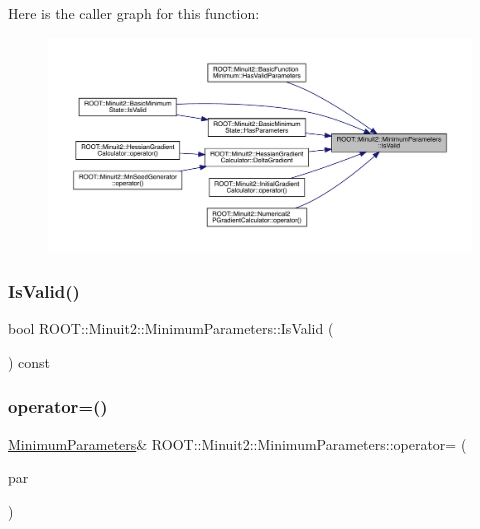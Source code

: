 Here is the caller graph for this function\+:
\nopagebreak
\begin{figure}[H]
\begin{center}
\leavevmode
\includegraphics[width=350pt]{db/db8/classROOT_1_1Minuit2_1_1MinimumParameters_a4b30eb313781bc8e344efa322461952a_icgraph}
\end{center}
\end{figure}
\mbox{\label{classROOT_1_1Minuit2_1_1MinimumParameters_a4b30eb313781bc8e344efa322461952a}} 
\subsubsection{\texorpdfstring{IsValid()}{IsValid()}\hspace{0.1cm}{\footnotesize\ttfamily [3/3]}}
{\footnotesize\ttfamily bool R\+O\+O\+T\+::\+Minuit2\+::\+Minimum\+Parameters\+::\+Is\+Valid (\begin{DoxyParamCaption}{ }\end{DoxyParamCaption}) const\hspace{0.3cm}{\ttfamily [inline]}}

\mbox{\label{classROOT_1_1Minuit2_1_1MinimumParameters_a60b35f7b9d6b7e49d2573581a3a9f081}} 
\subsubsection{\texorpdfstring{operator=()}{operator=()}\hspace{0.1cm}{\footnotesize\ttfamily [1/3]}}
{\footnotesize\ttfamily \mbox{\hyperlink{classROOT_1_1Minuit2_1_1MinimumParameters}{Minimum\+Parameters}}\& R\+O\+O\+T\+::\+Minuit2\+::\+Minimum\+Parameters\+::operator= (\begin{DoxyParamCaption}\item[{const \mbox{\hyperlink{classROOT_1_1Minuit2_1_1MinimumParameters}{Minimum\+Parameters}} \&}]{par }\end{DoxyParamCaption})\hspace{0.3cm}{\ttfamily [inline]}}

